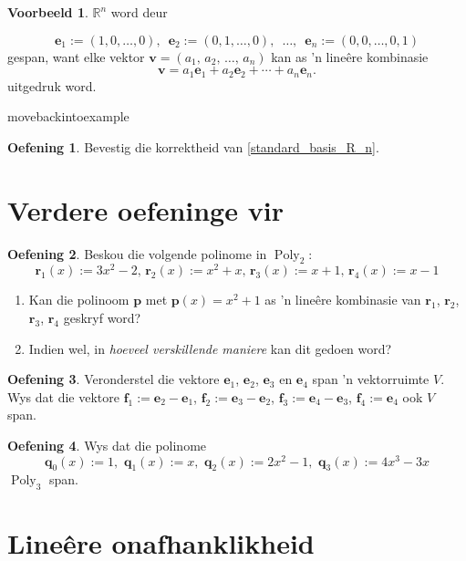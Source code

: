 \documentclass[a4paper,11pt]{book}
\theoremstyle{definition}
\newtheorem{exercise}{Oefening}
\newtheorem{example_environment}{Voorbeeld}[chapter]
\newcommand{\be}{\begin{equation}}
\newcommand{\ee}{\end{equation}}
\newcommand{\ve}[1]{\mathbf{#1}}
\newcommand{\furtherexercises}{\section*{Verdere oefeninge vir
\thesection}}
\newenvironment{example}
	{
		\begin{oframed}
		\begin{example_environment}
	}
	{
		\end{example_environment}
		\end{oframed}
	}
\DeclareMathOperator{\Poly}{Poly}
\begin{document}
\begin{example} $\mathbb{R}^n$ word deur\label{Rn_spanning_set}

	\be \label{defn_of_e_i}
		\ve{e}_1 := (1, 0, \ldots, 0), \,\,\, \ve{e}_2 := (0, 1, \ldots,
		0), \,\,\, \ldots, \,\,\, \ve{e}_n := (0, 0, \ldots, 0, 1)
	\ee
	gespan, want elke vektor $\ve{v} = (a_1, \,a_2, \, \ldots, \, a_n)$
	kan as 'n line{\^e}re kombinasie
	\be \label{standard_basis_R_n}
	\ve{v} = a_1 \ve{e}_1 + a_2 \ve{e}_2 + \cdots + a_n \ve{e}_n.
	\ee
	uitgedruk word.

\end{example}movebackintoexample
	\begin{exercise}
	Bevestig die korrektheid van \eqref{standard_basis_R_n}.
\end{exercise}
\furtherexercises
\begin{exercise} Beskou die volgende polinome in $\Poly_2$:
	\[
		\ve{r}_1 (x) := 3x^2 - 2, \, \ve{r}_2 (x) := x^2 + x, \, \ve{r}_3
		(x) := x + 1, \, \ve{r}_4 (x) := x-1
	\]
	\begin{enumerate}
		\item Kan die polinoom $\ve{p}$ met $\ve{p}(x) = x^2 + 1$ as 'n
			line{\^e}re kombinasie van $\ve{r}_1$, $\ve{r}_2$, $\ve{r}_3$,
			$\ve{r}_4$ geskryf word?
		\item Indien wel, in {\em hoeveel verskillende maniere} kan dit
			gedoen word?
	\end{enumerate}
\end{exercise}

\begin{exercise} Veronderstel die vektore $\ve{e}_1$, $\ve{e}_2$,
	$\ve{e}_3$ en $\ve{e}_4$ span 'n vektorruimte $V$. Wys dat die vektore
	$\ve{f}_1 := \ve{e}_2 - \ve{e}_1$, $\ve{f}_2 := \ve{e}_3 - \ve{e}_2$,
	$\ve{f}_3 := \ve{e}_4 - \ve{e}_3$, $\ve{f}_4 := \ve{e}_4$ ook $V$ span.
\end{exercise}

\begin{exercise} Wys dat die polinome \label{chebyshev_example}
	\[
		\ve{q}_0 (x) := 1, \,\, \ve{q}_1 (x) := x, \,\, \ve{q}_2 (x) :=
		2x^2 - 1, \,\,
		\ve{q}_3 (x) := 4x^3 - 3x
	\]
	$\Poly_3$ span.
\end{exercise}



\section{Line{\^e}re onafhanklikheid} \label{ACh2Sec2LinearIndependence}
\end{document}
